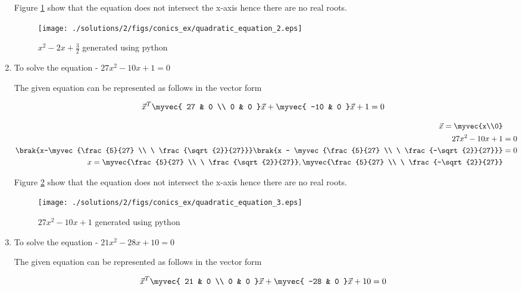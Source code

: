 \begin{enumerate}
Figure \ref{fig:5.2.2_quadeq2_conics_ex} show that the equation does not intersect the x-axis hence there are no real roots.

\begin{figure}[!ht]
\centering
\texttt{[image: ./solutions/2/figs/conics\_ex/quadratic\_equation\_2.eps]}
\caption{$x^2-2x+\frac{3}{2}$ generated using python}
\label{fig:5.2.2_quadeq2_conics_ex}
\end{figure} 
\item To solve the equation - $27x^2-10x+1 = 0$ 
\begin{flushleft}
The given equation can be represented as follows in the vector form
\end{flushleft}
\begin{align}
\vec{x}^T 
\myvec{
27 & 0 \\
0 & 0
}
\vec{x} + 
\myvec{
-10 & 0 
}
\vec{x} + 1 = 0
\end{align}

\begin{align}
\vec{x} = \myvec{x\\0} \\
27x^2-10x+1 &= 0 \\
\brak{x-\myvec{\frac{5}{27} \\ \  \frac{\sqrt{2}}{27}}}\brak{x - \myvec{\frac{5}{27} \\ \ \frac{-\sqrt{2}}{27}}} &= 0 \\
x = \myvec{\frac{5}{27} \\ \  \frac{\sqrt{2}}{27}}, \myvec{\frac{5}{27} \\ \  \frac{-\sqrt{2}}{27}}
\end{align}

Figure \ref{fig:5.2.2_quadeq3_conics_ex} show that the equation does not intersect the x-axis hence there are no real roots.

\begin{figure}[!ht]
\centering
\texttt{[image: ./solutions/2/figs/conics\_ex/quadratic\_equation\_3.eps]}
\caption{$27x^2-10x+1$ generated using python}
\label{fig:5.2.2_quadeq3_conics_ex}
\end{figure} 
\item To solve the equation - $21x^2-28x+10 = 0$ 
\begin{flushleft}
The given equation can be represented as follows in the vector form
\end{flushleft}
\begin{align}
\vec{x}^T 
\myvec{
21 & 0 \\
0 & 0
}
\vec{x} + 
\myvec{
-28 & 0 
}
\vec{x} + 10 = 0
\end{align}


\end{enumerate}

